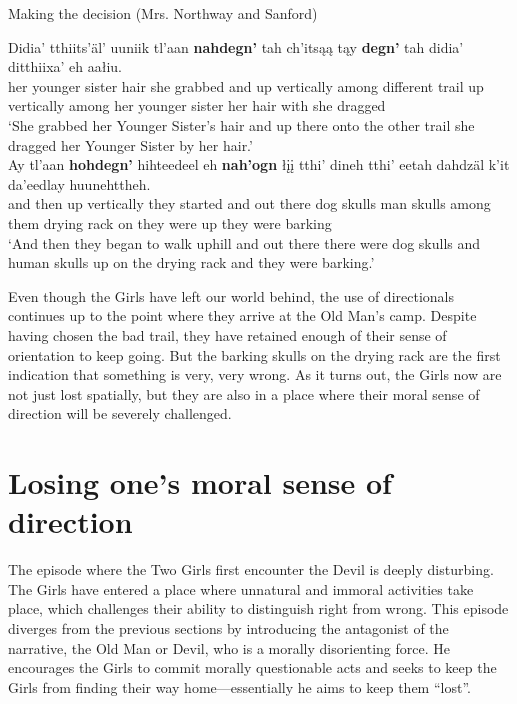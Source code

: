 \begin{exe}
\ex Making the decision (Mrs. Northway and Sanford) \label{brucks:decision-dn-js}
\begin{xlist}

\ex \gll Didia' tthiits'äl' uuniik tl'aan \textbf{nahdegn'} tah ch'itsąą tąy \textbf{degn'} tah didia' ditthiixa' eh aałiu.  \\
 {her younger sister} hair {she grabbed} and {up vertically} among different trail {up vertically} among {her younger sister} {her hair} with {she dragged} \\
\glt `She grabbed her Younger Sister's hair and up there onto the other trail she dragged her Younger Sister by her hair.' \\

\ex \gll Ay tl'aan \textbf{hohdegn'} hihteedeel eh \textbf{nah'ogn} łįį tthi' dineh tthi' eetah dahdzäl k'it da'eedlay huunehttheh.  \\
 and then {up vertically} {they started} and {out there} dog skulls man skulls {among them} {drying rack} on {they were up} {they were barking} \\
\glt `And then they began to walk uphill and out there there were dog skulls and human skulls up on the drying rack and they were barking.'   \\
\end{xlist}
\end{exe}

Even though the Girls have left our world behind, the use of directionals continues up to the point where they arrive at the Old Man's camp. Despite having chosen the bad trail, they have retained enough of their sense of orientation to keep going. But the barking skulls on the drying rack are the first indication that something is very, very wrong. As it turns out, the Girls now are not just lost spatially, but they are also in a place where their moral sense of direction will be severely challenged.

\section{Losing one's moral sense of direction}
\label{brucks:section:losing-moral-direction}

The episode where the Two Girls first encounter the Devil is deeply disturbing. The Girls have entered a place where unnatural and immoral activities take place, which challenges their ability to distinguish right from wrong. This episode diverges from the previous sections by introducing the antagonist of the narrative, the Old Man or Devil, who is a morally disorienting force. He encourages the Girls to commit morally questionable acts and seeks to keep the Girls from finding their way home---essentially he aims to keep them ``lost''.

